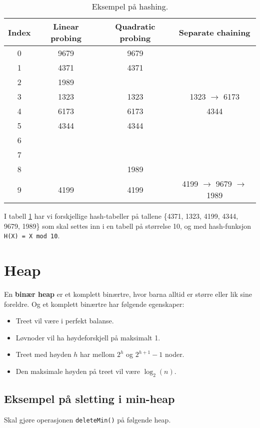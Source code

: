 \documentclass[11pt,a4paper]{article}
\theoremstyle{def}
\begin{document}
\begin{table}[h!]
\centering
\begin{tabular}{c|c|c|c}
Index & Linear probing & Quadratic probing & Separate chaining\\
\hline
0 & 9679 & 9679 &\\
1 & 4371 & 4371 & \\
2 & 1989 & &\\
3 & 1323 & 1323 & 1323 $\rightarrow$ 6173\\
4 & 6173 & 6173 & 4344\\
5 & 4344 & 4344 &\\
6 & & &\\
7 & & &\\
8 & & 1989 &\\
9 & 4199 & 4199 & 4199 $\rightarrow$ 9679 $\rightarrow$ 1989\\
\end{tabular}
\label{tab:hash}
\caption{Eksempel på hashing.}
\end{table}
I tabell \ref{tab:hash} har vi forskjellige hash-tabeller på tallene \{4371, 1323, 4199, 4344, 9679, 1989\} som skal settes inn i en tabell på størrelse 10, og med hash-funksjon \texttt{H(X) = X mod 10}.

\section{Heap}

En \textbf{binær heap} er et komplett binærtre, hvor barna alltid er større eller lik sine foreldre. Og et komplett binærtre har følgende egenskaper:

\begin{itemize}
\item
Treet vil være i perfekt balanse.
\item
Løvnoder vil ha høydeforskjell på maksimalt 1.
\item
Treet med høyden $h$ har mellom $2^h$ og $2^{h+1}-1$ noder.
\item
Den maksimale høyden på treet vil være $\log_2(n)$.
\end{itemize}

\subsection{Eksempel på sletting i min-heap}
Skal gjøre operasjonen \texttt{deleteMin()} på følgende heap.
\end{document}
